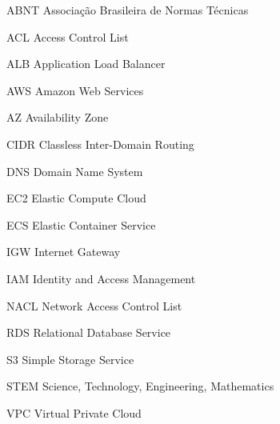 %
%
%

\begin{siglas}

 \item[ABNT] Associação Brasileira de Normas Técnicas
  \item[ACL] Access Control List
  \item[ALB] Application Load Balancer
  \item[AWS] Amazon Web Services
  \item[AZ] Availability Zone
  \item[CIDR] Classless Inter-Domain Routing
  \item[DNS] Domain Name System
  \item[EC2] Elastic Compute Cloud
  \item[ECS] Elastic Container Service
  \item[IGW] Internet Gateway
  \item[IAM] Identity and Access Management
  \item[NACL] Network Access Control List
  \item[RDS] Relational Database Service
  \item[S3] Simple Storage Service
  \item[STEM] Science, Technology, Engineering, Mathematics
  \item[VPC] Virtual Private Cloud


\end{siglas}

